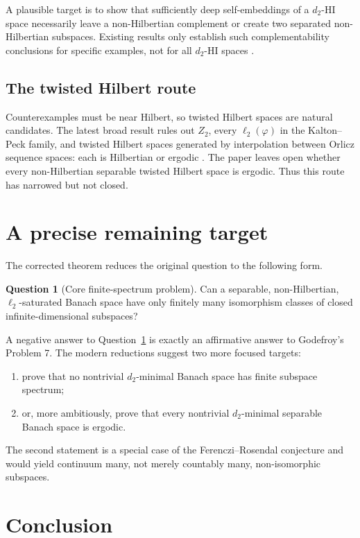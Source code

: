 \documentclass[11pt]{article}
\theoremstyle{definition}
\newtheorem{question}[theorem]{Question}
\theoremstyle{remark}
\newcommand{\ellTwo}{\ell_2}
\begin{document}
A plausible target is to show that sufficiently deep self-embeddings of a \(d_2\)-HI space necessarily leave a non-Hilbertian complement or create two separated non-Hilbertian subspaces.  Existing results only establish such complementability conclusions for specific examples, not for all \(d_2\)-HI spaces \cite[Section 6.2]{CCRF2023}.

\subsection{The twisted Hilbert route}

Counterexamples must be near Hilbert, so twisted Hilbert spaces are natural candidates.  The latest broad result rules out \(Z_2\), every \(\ell_2(\varphi)\) in the Kalton--Peck family, and twisted Hilbert spaces generated by interpolation between Orlicz sequence spaces: each is Hilbertian or ergodic \cite{dRK2026}.  The paper leaves open whether every non-Hilbertian separable twisted Hilbert space is ergodic.  Thus this route has narrowed but not closed.

\section{A precise remaining target}

The corrected theorem reduces the original question to the following form.

\begin{question}[Core finite-spectrum problem]\label{q:core}
Can a separable, non-Hilbertian, \(\ellTwo\)-saturated Banach space have only finitely many isomorphism classes of closed infinite-dimensional subspaces?
\end{question}

A negative answer to Question~\ref{q:core} is exactly an affirmative answer to Godefroy's Problem 7.  The modern reductions suggest two more focused targets:
\begin{enumerate}
  \item prove that no nontrivial \(d_2\)-minimal Banach space has finite subspace spectrum;
  \item or, more ambitiously, prove that every nontrivial \(d_2\)-minimal separable Banach space is ergodic.
\end{enumerate}
The second statement is a special case of the Ferenczi--Rosendal conjecture and would yield continuum many, not merely countably many, non-isomorphic subspaces.

\section{Conclusion}
\end{document}
